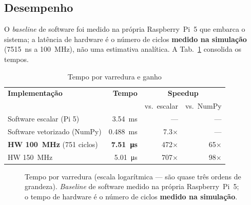 \documentclass[conference]{IEEEtran}
\begin{document}
\subsection{Desempenho}

O \emph{baseline} de software foi medido na pr\'opria Raspberry~Pi~5 que embarca o
sistema; a lat\^encia de hardware \'e o n\'umero de ciclos \textbf{medido na
simula\c{c}\~ao} (\SI{7515}{\nano\second} a \SI{100}{\mega\hertz}), n\~ao uma
estimativa anal\'itica. A Tab.~\ref{tab:speedup} consolida os tempos.

\begin{table}[!t]
\caption{Tempo por varredura e ganho}
\label{tab:speedup}
\centering\footnotesize
\begin{tabular}{@{}lrrr@{}}
\toprule
\textbf{Implementa\c{c}\~ao} & \textbf{Tempo} & \multicolumn{2}{c}{\textbf{Speedup}} \\
 & & vs.\ escalar & vs.\ NumPy \\
\midrule
Software escalar (Pi 5)      & \SI{3.54}{\milli\second}   & --- & --- \\
Software vetorizado (NumPy)  & \SI{0.488}{\milli\second}  & \num{7.3}$\times$ & --- \\
\textbf{HW \SI{100}{\mega\hertz}} (\num{751} ciclos) & \textbf{\SI{7.51}{\micro\second}} & \num{472}$\times$ & \num{65}$\times$ \\
HW \SI{150}{\mega\hertz}     & \SI{5.01}{\micro\second}   & \num{707}$\times$ & \num{98}$\times$ \\
\bottomrule
\end{tabular}
\end{table}

\begin{figure}[!t]
\centering
{}
\caption{Tempo por varredura (escala logar\'itmica --- s\~ao quase tr\^es ordens de
grandeza). \emph{Baseline} de software medido na pr\'opria Raspberry~Pi~5; o
tempo de hardware \'e o n\'umero de ciclos \textbf{medido na simula\c{c}\~ao}.}
\label{fig:tempos}
\end{figure}
\end{document}
